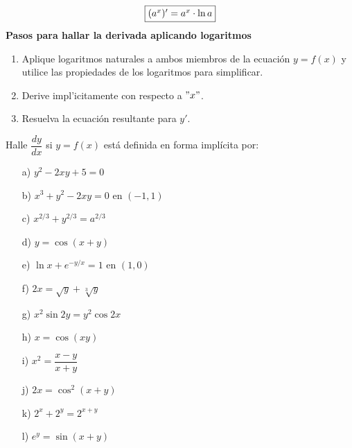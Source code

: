 \documentclass[10pt,twoside]{SelfArx} %
\begin{document}
\begin{equation}
\fbox{$ (a^{x})'=a^{x}\cdot \ln a $}
\end{equation}
\textbf{Pasos para hallar la derivada aplicando logaritmos}\\
\begin{enumerate}
	\item Aplique logaritmos naturales a ambos miembros de la ecuación $ y=f(x) $ y utilice las propiedades de los logaritmos para simplificar.
	\item Derive impl'icitamente con respecto a $ "x"$.
	\item Resuelva la ecuación resultante para $ y' $.
\end{enumerate}
Halle $ \dfrac{dy}{dx} $ si $ y=f(x) $ está definida en forma implícita por:
\begin{enumerate}
	\item[a)] $ y^{2}-2xy+5=0 $
	\item [b)]$ x^{3}+y^{2}-2xy=0 $ en $ (-1,1) $
	\item [c)]$ x^{2/3}+y^{2/3}=a^{2/3} $
	\item [d)]$ y=\cos(x+y) $
	\item [e)] $ \ln x+e^{-y/x}=1  $ en $ (1,0) $
	\item [f)] $ 2x=\sqrt{y}+\sqrt[3]{y} $
	\item [g)] $ x^{2}\sin2y=y^{2}\cos2x $
	\item [h)] $ x=\cos (xy) $
	\item  [i)] $ x^{2}=\dfrac{x-y}{x+y} $
	\item [j)] $ 2x=\cos^{2}(x+y) $
	\item [k)] $ 2^{x}+2^{y}=2^{x+y} $
	\item [l)] $ e^{y} = \sin(x+y )$
\end{enumerate}
\end{document}
